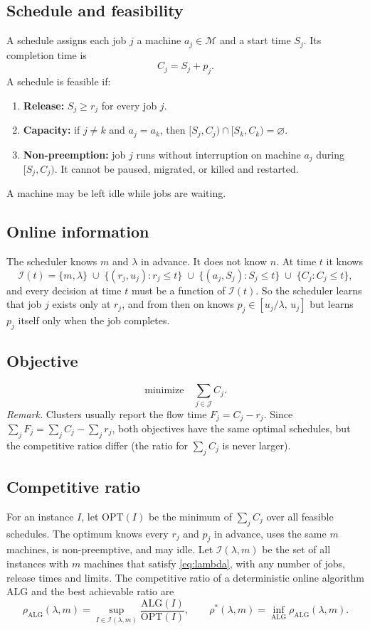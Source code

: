 \documentclass[11pt]{article}
\newcommand{\OPT}{\mathrm{OPT}}
\newcommand{\ALG}{\mathrm{ALG}}
\begin{document}
\subsection{Schedule and feasibility}

A schedule assigns each job $j$ a machine $a_j\in\mathcal{M}$ and a start time $S_j$. Its
completion time is
\[
  C_j = S_j + p_j .
\]
A schedule is feasible if:
\begin{enumerate}
  \item \textbf{Release:} $S_j\ge r_j$ for every job $j$.
  \item \textbf{Capacity:} if $j\ne k$ and $a_j=a_k$, then $[S_j,C_j)\cap[S_k,C_k)=\varnothing$.
  \item \textbf{Non-preemption:} job $j$ runs without interruption on machine $a_j$ during
        $[S_j,C_j)$. It cannot be paused, migrated, or killed and restarted.
\end{enumerate}
A machine may be left idle while jobs are waiting.

\subsection{Online information}

The scheduler knows $m$ and $\lambda$ in advance. It does not know $n$. At time $t$ it knows
\[
  \mathcal{I}(t)=\{m,\lambda\}
  \;\cup\;\{(r_j,u_j): r_j\le t\}
  \;\cup\;\{(a_j,S_j): S_j\le t\}
  \;\cup\;\{C_j: C_j\le t\},
\]
and every decision at time $t$ must be a function of $\mathcal{I}(t)$. So the scheduler learns that
job $j$ exists only at $r_j$, and from then on knows $p_j\in[u_j/\lambda,\,u_j]$ but learns $p_j$
itself only when the job completes.

\subsection{Objective}

\[
  \text{minimize}\quad \sum_{j\in\mathcal{J}} C_j .
\]
\emph{Remark.} Clusters usually report the flow time $F_j=C_j-r_j$. Since
$\sum_j F_j=\sum_j C_j-\sum_j r_j$, both objectives have the same optimal schedules, but the
competitive ratios differ (the ratio for $\sum_j C_j$ is never larger).

\subsection{Competitive ratio}

For an instance $I$, let $\OPT(I)$ be the minimum of $\sum_j C_j$ over all feasible schedules. The
optimum knows every $r_j$ and $p_j$ in advance, uses the same $m$ machines, is non-preemptive, and
may idle. Let $\mathcal{I}(\lambda,m)$ be the set of all instances with $m$ machines that satisfy
\eqref{eq:lambda}, with any number of jobs, release times and limits. The competitive ratio of a
deterministic online algorithm $\ALG$ and the best achievable ratio are
\[
  \rho_{\ALG}(\lambda,m)=\sup_{I\in\mathcal{I}(\lambda,m)}\frac{\ALG(I)}{\OPT(I)},
  \qquad
  \rho^{*}(\lambda,m)=\inf_{\ALG}\rho_{\ALG}(\lambda,m).
\]
\end{document}
